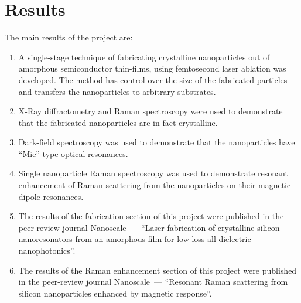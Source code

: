 \section{Results}
    The main results of the project are:
    \begin{enumerate}
        \item A single-stage technique of fabricating crystalline nanoparticles out of amorphous
            semiconductor thin-films, using femtosecond laser ablation was developed. The method
            has control over the size of the fabricated particles and transfers the nanoparticles
            to arbitrary substrates.
        \item X-Ray diffractometry and Raman spectroscopy were used to demonstrate that the
            fabricated nanoparticles are in fact crystalline.
        \item Dark-field spectroscopy was used to demonstrate that the nanoparticles have
            ``Mie''-type optical resonances.
        \item Single nanoparticle Raman spectroscopy was used to demonstrate resonant enhancement of Raman scattering
            from the nanoparticles on their magnetic dipole resonances.
        \item The results of the fabrication section of this project were published in the peer-review
            journal Nanoscale~--- ``Laser fabrication of
            crystalline silicon nanoresonators from an amorphous film for low-loss all-dielectric nanophotonics''\cite{dmitriev2016laser}.
        \item The results of the Raman enhancement section of this project were published in the peer-review
            journal Nanoscale~--- ``Resonant Raman scattering from silicon nanoparticles
            enhanced by magnetic response''\cite{dmitriev2016resonant}.
    \end{enumerate}
\clearpage
